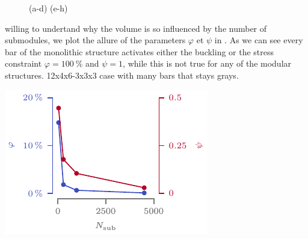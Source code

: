 \begin{figure}
        \hfill
        \hfill
        \hspace*{\fill}
        \caption{(a-d) (e-h)}
        \label{fig:05_scale_results}
    \end{figure}

    
    willing to undertand why the volume is so influenced by the number of submodules, we plot the allure of the parameters $\varphi$ et $\psi$ in . As we can see every bar of the monolithic structure activates either the buckling or the stress constraint $\varphi=\qty{100}{\percent}$ and $\psi=1$, while this is  not true for any of the modular structures. 12x4x6-3x3x3 case with many bars that stays grays.
    \begin{marginfigure}
        \centering
        \includegraphics[width=\linewidth]{figures/05_cellular_opt/00_module_scale_tab/scale_tab_param.pdf}
        \caption{}
        \label{fig:05_scale_param}
    \end{marginfigure}
    
